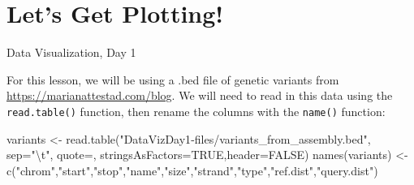 \documentclass[
  letterpaper,
  DIV=11,
  numbers=noendperiod]{scrreprt}
\newenvironment{Shaded}{\begin{snugshade}}{\end{snugshade}}
\newcommand{\AttributeTok}[1]{\textcolor[rgb]{0.40,0.45,0.13}{#1}}
\newcommand{\CommentTok}[1]{\textcolor[rgb]{0.37,0.37,0.37}{#1}}
\newcommand{\ConstantTok}[1]{\textcolor[rgb]{0.56,0.35,0.01}{#1}}
\newcommand{\FunctionTok}[1]{\textcolor[rgb]{0.28,0.35,0.67}{#1}}
\newcommand{\NormalTok}[1]{\textcolor[rgb]{0.00,0.23,0.31}{#1}}
\newcommand{\OtherTok}[1]{\textcolor[rgb]{0.00,0.23,0.31}{#1}}
\newcommand{\SpecialCharTok}[1]{\textcolor[rgb]{0.37,0.37,0.37}{#1}}
\newcommand{\StringTok}[1]{\textcolor[rgb]{0.13,0.47,0.30}{#1}}
\begin{document}
\begin{Shaded}
\end{Shaded}


\chapter{Let's Get Plotting!}\label{lets-get-plotting}

Data Visualization, Day 1

\hfill\break

For this lesson, we will be using a .bed file of genetic variants from
\url{https://marianattestad.com/blog}. We will need to read in this data
using the \texttt{read.table()} function, then rename the columns with
the \texttt{name()} function:

\begin{Shaded}
\begin{Highlighting}[]
\NormalTok{variants }\OtherTok{\textless{}{-}} \FunctionTok{read.table}\NormalTok{(}\StringTok{"DataVizDay1{-}files/variants\_from\_assembly.bed"}\NormalTok{, }\AttributeTok{sep=}\StringTok{"}\SpecialCharTok{\textbackslash{}t}\StringTok{"}\NormalTok{, }\AttributeTok{quote=}\StringTok{\textquotesingle{}\textquotesingle{}}\NormalTok{, }\AttributeTok{stringsAsFactors=}\ConstantTok{TRUE}\NormalTok{,}\AttributeTok{header=}\ConstantTok{FALSE}\NormalTok{)}
\FunctionTok{names}\NormalTok{(variants) }\OtherTok{\textless{}{-}} \FunctionTok{c}\NormalTok{(}\StringTok{"chrom"}\NormalTok{,}\StringTok{"start"}\NormalTok{,}\StringTok{"stop"}\NormalTok{,}\StringTok{"name"}\NormalTok{,}\StringTok{"size"}\NormalTok{,}\StringTok{"strand"}\NormalTok{,}\StringTok{"type"}\NormalTok{,}\StringTok{"ref.dist"}\NormalTok{,}\StringTok{"query.dist"}\NormalTok{)}
\end{Highlighting}
\end{Shaded}
\end{document}
